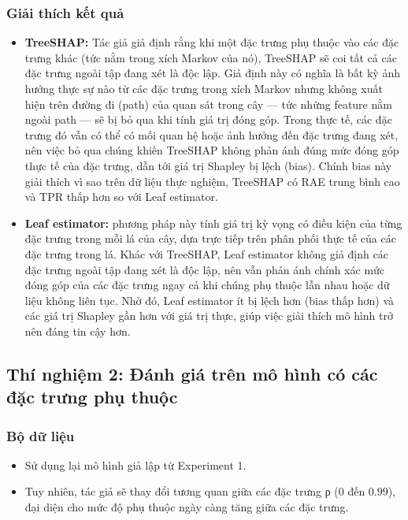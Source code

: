 \documentclass[12pt, a4paper]{article}
\begin{document}
\subsubsection{Giải thích kết quả}
        \begin{itemize}[align=parleft, left=4em, labelsep=1em, itemsep=0.5em]
            \item \textbf{TreeSHAP: }Tác giả giả định rằng khi một đặc trưng phụ thuộc vào các đặc trưng khác (tức nằm trong xích Markov của nó), TreeSHAP sẽ coi tất cả các đặc trưng ngoài tập đang xét là độc lập. Giả định này có nghĩa là bất kỳ ảnh hưởng thực sự nào từ các đặc trưng trong xích Markov nhưng không xuất hiện trên đường đi (path) của quan sát trong cây — tức những feature nằm ngoài path — sẽ bị bỏ qua khi tính giá trị đóng góp. Trong thực tế, các đặc trưng đó vẫn có thể có mối quan hệ hoặc ảnh hưởng đến đặc trưng đang xét, nên việc bỏ qua chúng khiến TreeSHAP không phản ánh đúng mức đóng góp thực tế của đặc trưng, dẫn tới giá trị Shapley bị lệch (bias). Chính bias này giải thích vì sao trên dữ liệu thực nghiệm, TreeSHAP có RAE trung bình cao và TPR thấp hơn so với Leaf estimator.
    
            \item \textbf{Leaf estimator: }phương pháp này tính giá trị kỳ vọng có điều kiện của từng đặc trưng trong mỗi lá của cây, dựa trực tiếp trên phân phối thực tế của các đặc trưng trong lá. Khác với TreeSHAP, Leaf estimator không giả định các đặc trưng ngoài tập đang xét là độc lập, nên vẫn phản ánh chính xác mức đóng góp của các đặc trưng ngay cả khi chúng phụ thuộc lẫn nhau hoặc dữ liệu không liên tục. Nhờ đó, Leaf estimator ít bị lệch hơn (bias thấp hơn) và các giá trị Shapley gần hơn với giá trị thực, giúp việc giải thích mô hình trở nên đáng tin cậy hơn.
    
        \end{itemize}   

\subsection{Thí nghiệm 2: Đánh giá trên mô hình có các đặc trưng phụ thuộc}
\subsubsection{Bộ dữ liệu}
        \begin{itemize}[align=parleft, left=4em, labelsep=1em, itemsep=0.5em]
            \item Sử dụng lại mô hình giả lập từ Experiment 1.
            \item Tuy nhiên, tác giả sẽ thay đổi tương quan giữa các đặc trưng ρ ($0$ đến $0.99$), đại diện cho mức độ phụ thuộc ngày càng tăng giữa các đặc trưng.
        \end{itemize}
\end{document}
